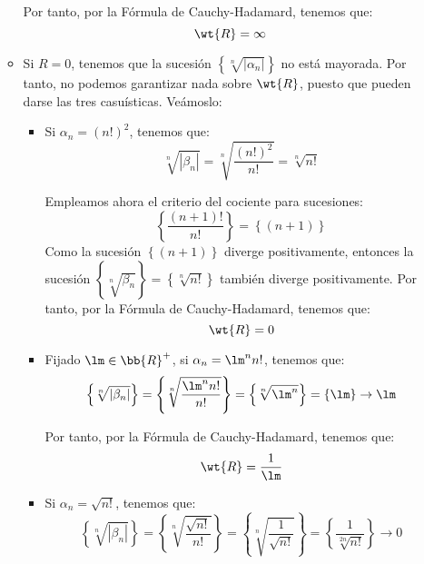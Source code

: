 \begin{ejercicio}
\begin{enumerate}
\begin{itemize}
            Por tanto, por la Fórmula de Cauchy-Hadamard, tenemos que:
            \begin{equation*}
                \wt{R} = \infty
            \end{equation*}

            \item Si $R=0$, tenemos que la sucesión $\left\{\sqrt[n]{|\alpha_n|}\right\}$ no está mayorada. Por tanto, no podemos garantizar nada sobre $\wt{R}$, puesto que pueden darse las tres casuísticas. Veámoslo:
            \begin{itemize}
                \item Si $\alpha_n=(n!)^2$, tenemos que:
                \begin{equation*}
                    \sqrt[n]{|\beta_n|} = \sqrt[n]{\dfrac{(n!)^2}{n!}} = \sqrt[n]{n!}
                \end{equation*}

                Empleamos ahora el criterio del cociente para sucesiones:
                \begin{equation*}
                    \left\{\dfrac{(n+1)!}{n!}\right\}= \left\{(n+1)\right\}
                \end{equation*}
                Como la sucesión $\left\{(n+1)\right\}$ diverge positivamente, entonces la sucesión $\left\{\sqrt[n]{\beta_n}\right\}= \left\{\sqrt[n]{n!}\right\}$ también diverge positivamente. Por tanto, por la Fórmula de Cauchy-Hadamard, tenemos que:
                \begin{equation*}
                    \wt{R} = 0
                \end{equation*}

                \item Fijado $\lm\in \bb{R}^+$, si $\alpha_n=\lm^nn!$, tenemos que:
                \begin{equation*}
                    \left\{\sqrt[n]{|\beta_n|}\right\} = \left\{\sqrt[n]{\dfrac{\lm^nn!}{n!}}\right\} = \left\{\sqrt[n]{\lm^n}\right\} = \left\{\lm\right\}\to \lm
                \end{equation*}

                Por tanto, por la Fórmula de Cauchy-Hadamard, tenemos que:
                \begin{equation*}
                    \wt{R} = \dfrac{1}{\lm}
                \end{equation*}

                \item Si $\alpha_n=\sqrt{n!}$, tenemos que:
                \begin{equation*}
                    \left\{\sqrt[n]{|\beta_n|}\right\} = \left\{\sqrt[n]{\dfrac{\sqrt{n!}}{n!}}\right\} = \left\{\sqrt[n]{\dfrac{1}{\sqrt{n!}}}\right\}
                    = \left\{\dfrac{1}{\sqrt[2n]{n!}}\right\}\to 0
                \end{equation*}


\end{itemize}
\end{itemize}
\end{enumerate}
\end{ejercicio}
